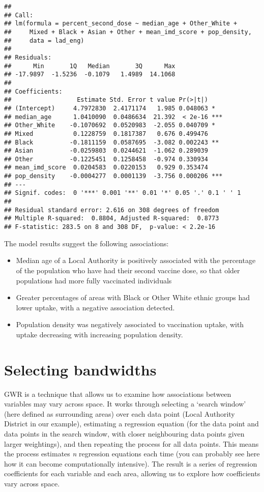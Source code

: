 \documentclass[
]{book}
\providecommand{\tightlist}{%
  \setlength{\itemsep}{0pt}\setlength{\parskip}{0pt}}
\begin{document}
\begin{verbatim}
## 
## Call:
## lm(formula = percent_second_dose ~ median_age + Other_White + 
##     Mixed + Black + Asian + Other + mean_imd_score + pop_density, 
##     data = lad_eng)
## 
## Residuals:
##      Min       1Q   Median       3Q      Max 
## -17.9897  -1.5236  -0.1079   1.4989  14.1068 
## 
## Coefficients:
##                  Estimate Std. Error t value Pr(>|t|)    
## (Intercept)     4.7972830  2.4171174   1.985 0.048063 *  
## median_age      1.0410090  0.0486634  21.392  < 2e-16 ***
## Other_White    -0.1070692  0.0520983  -2.055 0.040709 *  
## Mixed           0.1228759  0.1817387   0.676 0.499476    
## Black          -0.1811159  0.0587695  -3.082 0.002243 ** 
## Asian          -0.0259803  0.0244621  -1.062 0.289039    
## Other          -0.1225451  0.1258458  -0.974 0.330934    
## mean_imd_score  0.0204583  0.0220153   0.929 0.353474    
## pop_density    -0.0004277  0.0001139  -3.756 0.000206 ***
## ---
## Signif. codes:  0 '***' 0.001 '**' 0.01 '*' 0.05 '.' 0.1 ' ' 1
## 
## Residual standard error: 2.616 on 308 degrees of freedom
## Multiple R-squared:  0.8804, Adjusted R-squared:  0.8773 
## F-statistic: 283.5 on 8 and 308 DF,  p-value: < 2.2e-16
\end{verbatim}

The model results suggest the following associations:

\begin{itemize}
\tightlist
\item
  Median age of a Local Authority is positively associated with the percentage of the population who have had their second vaccine dose, so that older populations had more fully vaccinated individuals
\item
  Greater percentages of areas with Black or Other White ethnic groups had lower uptake, with a negative association detected.
\item
  Population density was negatively associated to vaccination uptake, with uptake decreasing with increasing population density.
\end{itemize}

\hypertarget{selecting-bandwidths}{%
\section{Selecting bandwidths}\label{selecting-bandwidths}}

GWR is a technique that allows us to examine how associations between variables may vary across space. It works through selecting a `search window' (here defined as surrounding areas) over each data point (Local Authority District in our example), estimating a regression equation (for the data point and data points in the search window, with closer neighbouring data points given larger weightings), and then repeating the process for all data points. This means the process estimates \emph{n} regression equations each time (you can probably see here how it can become computationally intensive). The result is a series of regression coefficients for each variable and each area, allowing us to explore how coefficients vary across space.
\end{document}
